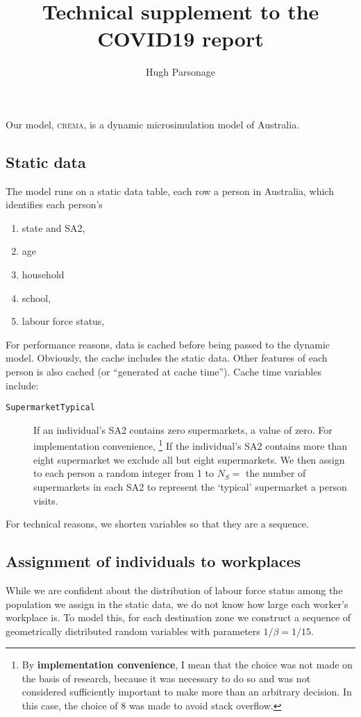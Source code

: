 \documentclass{grattan}
\title{Technical supplement to the COVID19 report}
\author{Hugh Parsonage}
\newcommand*{\code}[1]{\texttt{#1}}
\newcommand*{\defi}[1]{\textbf{#1}}
\providecommand{\crema}{\textsc{crema}}
\begin{document}
\contentspage

Our model, \crema, is a dynamic microsimulation model of Australia. 

\subsection{Static data}
The model runs on a static data table, each row a person in Australia, 
which identifies each person's

\begin{enumerate}
	\item state and SA2,
	\item age
	\item household
	\item school,
	\item labour force status,
\end{enumerate}

For performance reasons, data is cached before being passed to the dynamic model.
Obviously, the cache includes the static data. Other features of each person is 
also cached (or ``generated at cache time''). Cache time variables include:

\begin{description}
\item[\code{SupermarketTypical}] If an individual's SA2 contains zero supermarkets, 
a value of zero. 
For implementation convenience,%
	\footnote{By \defi{implementation convenience}, I mean that the choice was not made 
	on the basis of research, because it was necessary to do so and was not considered 
	sufficiently important to make more than an arbitrary decision. In this case,
	the choice of 8 was made to avoid stack overflow.}
If the individual's SA2 contains more than eight supermarket we 
exclude all but eight supermarkets. We then assign to each person a random integer
from 1 to \(N_S = {}\) the number of supermarkets in each SA2 to represent the 
`typical' supermarket a person visits.
\end{description}

For technical reasons, we shorten variables so that they are a sequence. 

\subsection{Assignment of individuals to workplaces}
While we are confident about the distribution of labour force status among
the population we assign in the static data, we do not know how large each 
worker's workplace is. To model this, for each destination zone we construct
a sequence of geometrically distributed random variables with parameters 
\(1/\beta = 1/15\). 
\end{document}
